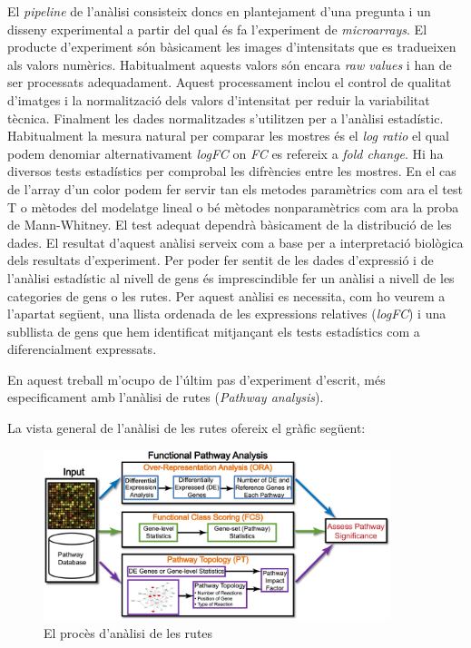 El \textit{pipeline} de l'anàlisi consisteix doncs en plantejament d'una pregunta i un disseny experimental a partir del qual és fa l'experiment de \textit{microarrays}. El producte d'experiment són bàsicament les images d'intensitats que es tradueixen als valors numèrics. Habitualment aquests valors són encara \textit{raw values} i han de ser processats adequadament. Aquest processament inclou el control de qualitat d'imatges i la normalització dels valors d'intensitat per reduir la variabilitat tècnica. Finalment les dades normalitzades s'utilitzen per a l'anàlisi estadístic. Habitualment la mesura natural per comparar les mostres és el \textit{log ratio} el qual podem denomiar alternativament \textit{logFC} on \textit{FC} es refereix a \textit{fold change}. Hi ha diversos tests estadístics per comprobal les difrències entre les mostres. En el cas de l'array d'un color podem fer servir tan els metodes paramètrics com ara el test T o mètodes del modelatge lineal o bé mètodes nonparamètrics com ara la proba de Mann-Whitney. El test adequat dependrà bàsicament de la distribució de les dades. El resultat d'aquest anàlisi serveix com a base per a interpretació biològica dels resultats d'experiment. Per poder fer sentit de les dades d'expressió i de l'anàlisi estadístic al nivell de gens és imprescindible fer un anàlisi a nivell de les categories de gens o les rutes. Per aquest anàlisi es necessita, com ho veurem a l'apartat següent, una llista ordenada de les expressions relatives (\textit{logFC}) i una subllista de gens que hem identificat mitjançant els tests estadístics com a diferencialment expressats.

En aquest treball m'ocupo de l'últim pas d'experiment d'escrit, més especificament amb l'anàlisi de rutes (\textit{Pathway analysis}).

La vista general de l'anàlisi de les rutes ofereix el gràfic següent:

\begin{figure}[H]
\centering
\includegraphics[width=0.9\textwidth]{figures/Pipeline_Pathway.png} 
\caption{El procès d'anàlisi de les rutes}
\end{figure}

